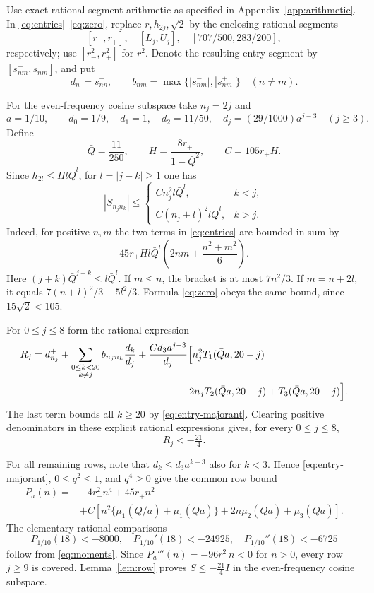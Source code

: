\documentclass[a4paper,11pt]{article}
\numberwithin{equation}{section}
\theoremstyle{definition}
\theoremstyle{remark}
\begin{document}
Use exact rational segment arithmetic as specified in Appendix~\ref{app:arithmetic}. In \eqref{eq:entries}--\eqref{eq:zero}, replace $r,h_{2j},\sqrt2$ by the enclosing rational segments
\[
 [r_-,r_+],\quad[L_j,U_j],\quad[707/500,283/200],
\]
respectively; use $[r_-^2,r_+^2]$ for $r^2$. Denote the resulting entry segment by $[s^-_{nm},s^+_{nm}]$, and put
\[
 d^+_n=s^+_{nn},\qquad b_{nm}=\max\{|s^-_{nm}|,|s^+_{nm}|\}\quad(n\ne m).
\]

For the even-frequency cosine subspace take $n_j=2j$ and
\[
 a=1/10,\qquad d_0=1/9,\quad d_1=1,\quad d_2=11/50,\quad
 d_j=(29/1000)a^{j-3}\quad(j\ge3).
\]
Define
\begin{equation}\label{eq:constants}
 \bar Q=\frac{11}{250},\qquad H=\frac{8r_+}{1-\bar Q^2},\qquad C=105r_+H.
\end{equation}
Since $h_{2l}\le Hl\bar Q^l$, for $l=|j-k|\ge1$ one has
\begin{equation}\label{eq:entry-majorant}
 |S_{n_jn_k}|\le
 \begin{cases}C n_j^2l\bar Q^l,&k<j,\\
 C(n_j+l)^2l\bar Q^l,&k>j.
 \end{cases}
\end{equation}
Indeed, for positive $n,m$ the two terms in \eqref{eq:entries} are bounded in sum by
\[
 45r_+Hl\bar Q^l\left(2nm+\frac{n^2+m^2}{6}\right).
\]
Here $(j+k)\bar Q^{j+k}\le l\bar Q^l$. If $m\le n$, the bracket is at most $7n^2/3$. If $m=n+2l$, it equals $7(n+l)^2/3-5l^2/3$. Formula \eqref{eq:zero} obeys the same bound, since $15\sqrt2<105$.

For $0\le j\le8$ form the rational expression
\begin{align}
 R_j={}&d^+_{n_j}+\sum_{\substack{0\le k<20\\k\ne j}}b_{n_jn_k}\frac{d_k}{d_j}
 +\frac{Cd_3a^{j-3}}{d_j}\Big[
 n_j^2T_1(\bar Qa,20-j)\nonumber\\
 &\hspace{47mm}+2n_jT_2(\bar Qa,20-j)+T_3(\bar Qa,20-j)\Big].\label{eq:finite-rational-row}
\end{align}
The last term bounds all $k\ge20$ by \eqref{eq:entry-majorant}. Clearing positive denominators in these explicit rational expressions gives, for every $0\le j\le8$,
\begin{equation}\label{eq:single-uniform}
 R_j<-\tfrac{21}{4}.
\end{equation}

For all remaining rows, note that $d_k\le d_3a^{k-3}$ also for $k<3$. Hence \eqref{eq:entry-majorant}, $0\le q^2\le1$, and $q^4\ge0$ give the common row bound
\begin{align}
 P_a(n)={}&-4r_-^2n^4+45r_+n^2\nonumber\\
 &+C\left[n^2\{\mu_1(\bar Q/a)+\mu_1(\bar Qa)\}
 +2n\mu_2(\bar Qa)+\mu_3(\bar Qa)\right].\label{eq:tail-P}
\end{align}
The elementary rational comparisons
\[
 P_{1/10}(18)<-8000,\quad P_{1/10}'(18)<-24925,\quad
 P_{1/10}''(18)<-6725
\]
follow from \eqref{eq:moments}. Since $P_a'''(n)=-96r_-^2n<0$ for $n>0$, every row $j\ge9$ is covered. Lemma~\ref{lem:row} proves $S\le-\tfrac{21}{4}I$ in the even-frequency cosine subspace.
\end{document}
